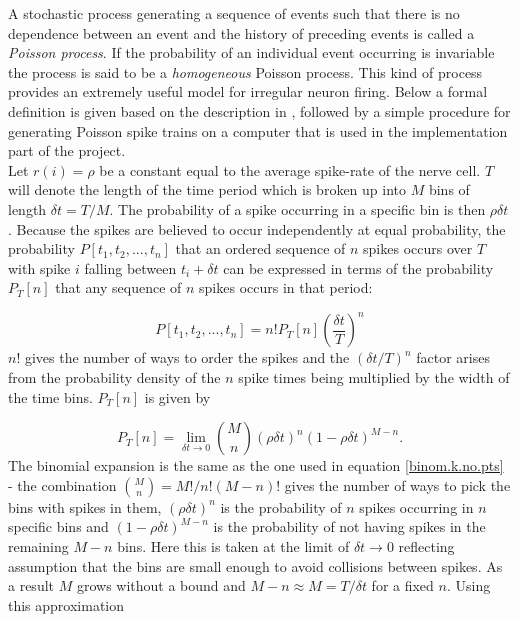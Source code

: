 \documentclass[12pt]{extarticle}
\begin{document}
\noindent
A stochastic process generating a sequence of events such that there
is no dependence between an event and the history of preceding events
is called a \textit{Poisson process}. If the probability of an
individual event occurring is invariable the process is said to be a
\textit{homogeneous} Poisson process. This kind of process provides an
extremely useful model for irregular neuron firing. Below a formal
definition is given based on the description in \cite{Dyan-Abbott}, followed by
a simple procedure for generating Poisson spike trains on a computer
that is used in the implementation part of the project.\\

\noindent
Let $r(i)=\rho$ be a constant equal to the average spike-rate of the
nerve cell. $T$ will denote the length of the time period which is
broken up into $M$ bins of length $\delta t=T/M$. The probability of a
spike occurring in a specific bin is then $\rho\delta t$. Because the
spikes are believed to occur independently at equal probability, the
probability $P\left[t_1,t_2,...,t_n\right]$ that an ordered sequence
of $n$ spikes occurs over $T$ with spike $i$ falling between
$t_i+\delta t$ can be expressed in terms of the probability $P_T[n]$
that any sequence of $n$ spikes occurs in that period:

\begin{equation}
P\left[t_1,t_2,...,t_n\right] = n!P_T[n]\left(\frac{\delta t}{T}\right)^n
\end{equation}
$n!$ gives the number of ways to order the spikes and the $(\delta t/
T)^n$ factor arises from the probability density of the $n$ spike
times being multiplied by the width of the time bins. $P_T[n]$ is
given by

\begin{equation}
P_T[n] = \lim_{\delta t \rightarrow 0} \binom{M}{n}(\rho\delta t)^n(1-\rho\delta t)^{M-n}.
\end{equation}
The binomial expansion is the same as the one used in equation \ref{binom.k.no.pts} -
the combination $\binom{M}{n}=M!/n!(M-n)!$ gives the number of ways to
pick the bins with spikes in them, $(\rho\delta t)^n$ is the
probability of $n$ spikes occurring in $n$ specific bins and
$(1-\rho\delta t)^{M-n}$ is the probability of not having spikes in
the remaining $M-n$ bins. Here this is taken at the limit of $\delta t
\rightarrow 0$ reflecting assumption that the bins are small enough to
avoid collisions between spikes. As a result $M$ grows without a bound
and $M-n \approx M = T/\delta t$ for a fixed $n$. Using this
approximation
\end{document}

